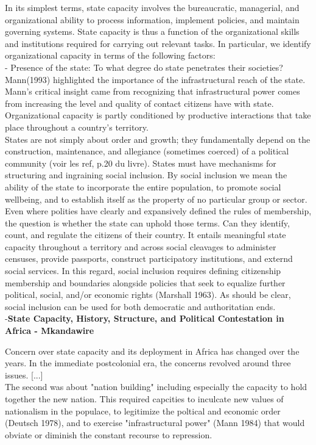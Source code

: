 \documentclass[11pt]{article}
\theoremstyle{plain}
\theoremstyle{plain}
\begin{document}
In its simplest terms, state capacity involves the bureaucratic, managerial, and organizational ability to process information, implement policies, and maintain governing systems. State capacity is thus a function of the organizational skills and institutions required for carrying out relevant tasks. In particular, we identify organizational capacity in terms of the following factors:\\
- Presence of the state: To what degree do state penetrates their societies? Mann(1993) highlighted the importance of the infrastructural reach of the state. Mann's critical insight came from recognizing that infrastructural power comes from increasing the level and quality of contact citizens have with state. Organizational capacity is partly conditioned by productive interactions that take place throughout a country's territory.\\

States are not simply about order and growth; they fundamentally depend on the construction, maintenance, and allegiance (sometimes coerced) of a political community (voir les ref, p.20 du livre). States must have mechanisms for structuring and ingraining social inclusion. By social inclusion we mean the ability of the state to incorporate the entire population, to promote social wellbeing, and to establish itself as the property of no particular group or sector.\\

Even where polities have clearly and expansively defined the rules of membership, the question is whether the state can uphold those terms. Can they identify, count, and regulate the citizens of their country. It entails meaningful state capacity throughout a territory and across social cleavages to administer censuses, provide passports, construct participatory institutions, and externd social services. In this regard, social inclusion requires defining citizenship membership and boundaries alongside policies that seek to equalize further political, social, and/or economic rights (Marshall 1963). As should be clear, social inclusion can be used for both democratic and authoritatian ends.\\

-\textbf{State Capacity, History, Structure, and Political Contestation in Africa - Mkandawire}

Concern over state capacity and its deployment in Africa has changed over the years. In the immediate postcolonial era, the concerns revolved around three issues. [...]\\
The second was about "nation building" including especially the capacity to hold together the new nation. This required capcities to inculcate new values of nationalism in the populace, to legitimize the poltical and economic order (Deutsch 1978), and to exercise "infrastructural power" (Mann 1984) that would obviate or diminish the constant recourse to repression.\\
\end{document}
